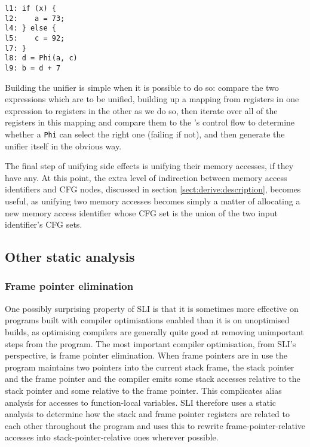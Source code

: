 \begin{verbatim}
l1: if (x) {
l2:    a = 73;
l4: } else {
l5:    c = 92;
l7: }
l8: d = Phi(a, c)
l9: b = d + 7
\end{verbatim}

Building the unifier is simple when it is possible to do so: compare
the two expressions which are to be unified, building up a mapping
from registers in one expression to registers in the other as we do
so, then iterate over all of the registers in this mapping and compare
them to the \StateMachine's control flow to determine whether a
\verb|Phi| can select the right one (failing if not), and then
generate the unifier itself in the obvious way.



The final step of unifying side effects is unifying their memory
accesses, if they have any.  At this point, the extra level of
indirection between memory access identifiers and CFG nodes, discussed
in section \ref{sect:derive:description}, becomes useful, as unifying
two memory accesses becomes simply a matter of allocating a new memory
access identifier whose CFG set is the union of the two input
identifier's CFG sets.

\subsection{Other static analysis}

\subsubsection{Frame pointer elimination}


One possibly surprising property of SLI is that it is sometimes more
effective on programs built with compiler optimisations enabled than
it is on unoptimised builds, as optimising compilers are generally
quite good at removing unimportant steps from the program.  The most
important compiler optimisation, from SLI's perspective, is frame
pointer elimination.  When frame pointers are in use the program
maintains two pointers into the current stack frame, the stack pointer
and the frame pointer and the compiler emits some stack accesses
relative to the stack pointer and some relative to the frame pointer.
This complicates alias analysis for accesses to function-local
variables.  SLI therefore uses a static analysis to determine how the
stack and frame pointer registers are related to each other throughout
the program and uses this to rewrite frame-pointer-relative accesses
into stack-pointer-relative ones wherever possible.

